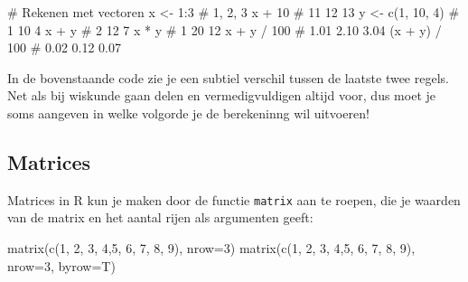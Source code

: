 \documentclass[
  b5paper,
  DIV=11,
  numbers=noendperiod]{scrreprt}
\newenvironment{Shaded}{\begin{snugshade}}{\end{snugshade}}
\newcommand{\AttributeTok}[1]{\textcolor[rgb]{0.40,0.45,0.13}{#1}}
\newcommand{\CommentTok}[1]{\textcolor[rgb]{0.37,0.37,0.37}{#1}}
\newcommand{\DecValTok}[1]{\textcolor[rgb]{0.68,0.00,0.00}{#1}}
\newcommand{\FunctionTok}[1]{\textcolor[rgb]{0.28,0.35,0.67}{#1}}
\newcommand{\NormalTok}[1]{\textcolor[rgb]{0.00,0.23,0.31}{#1}}
\newcommand{\OtherTok}[1]{\textcolor[rgb]{0.00,0.23,0.31}{#1}}
\newcommand{\SpecialCharTok}[1]{\textcolor[rgb]{0.37,0.37,0.37}{#1}}
\theoremstyle{definition}
\theoremstyle{remark}
\begin{document}
\begin{Shaded}
\begin{Highlighting}[]
\CommentTok{\# Rekenen met vectoren}
\NormalTok{x }\OtherTok{\textless{}{-}} \DecValTok{1}\SpecialCharTok{:}\DecValTok{3}           \CommentTok{\# 1, 2, 3}
\NormalTok{x }\SpecialCharTok{+} \DecValTok{10}             \CommentTok{\# 11 12 13}
\NormalTok{y }\OtherTok{\textless{}{-}} \FunctionTok{c}\NormalTok{(}\DecValTok{1}\NormalTok{, }\DecValTok{10}\NormalTok{, }\DecValTok{4}\NormalTok{)   }\CommentTok{\# 1 10 4}
\NormalTok{x }\SpecialCharTok{+}\NormalTok{ y              }\CommentTok{\# 2 12  7}
\NormalTok{x }\SpecialCharTok{*}\NormalTok{ y              }\CommentTok{\# 1 20 12}
\NormalTok{x }\SpecialCharTok{+}\NormalTok{ y }\SpecialCharTok{/} \DecValTok{100}        \CommentTok{\# 1.01 2.10 3.04}
\NormalTok{(x }\SpecialCharTok{+}\NormalTok{ y) }\SpecialCharTok{/} \DecValTok{100}      \CommentTok{\# 0.02 0.12 0.07}
\end{Highlighting}
\end{Shaded}

In de bovenstaande code zie je een subtiel verschil tussen de laatste
twee regels. Net als bij wiskunde gaan delen en vermedigvuldigen altijd
voor, dus moet je soms aangeven in welke volgorde je de berekeninng wil
uitvoeren!

\subsection{Matrices}\label{matrices}

Matrices in R kun je maken door de functie \texttt{matrix} aan te
roepen, die je waarden van de matrix en het aantal rijen als argumenten
geeft:

\begin{Shaded}
\begin{Highlighting}[]
\FunctionTok{matrix}\NormalTok{(}\FunctionTok{c}\NormalTok{(}\DecValTok{1}\NormalTok{, }\DecValTok{2}\NormalTok{, }\DecValTok{3}\NormalTok{, }\DecValTok{4}\NormalTok{,}\DecValTok{5}\NormalTok{, }\DecValTok{6}\NormalTok{, }\DecValTok{7}\NormalTok{, }\DecValTok{8}\NormalTok{, }\DecValTok{9}\NormalTok{), }\AttributeTok{nrow=}\DecValTok{3}\NormalTok{)}
\FunctionTok{matrix}\NormalTok{(}\FunctionTok{c}\NormalTok{(}\DecValTok{1}\NormalTok{, }\DecValTok{2}\NormalTok{, }\DecValTok{3}\NormalTok{, }\DecValTok{4}\NormalTok{,}\DecValTok{5}\NormalTok{, }\DecValTok{6}\NormalTok{, }\DecValTok{7}\NormalTok{, }\DecValTok{8}\NormalTok{, }\DecValTok{9}\NormalTok{), }\AttributeTok{nrow=}\DecValTok{3}\NormalTok{, }\AttributeTok{byrow=}\NormalTok{T)}
\end{Highlighting}
\end{Shaded}
\end{document}

